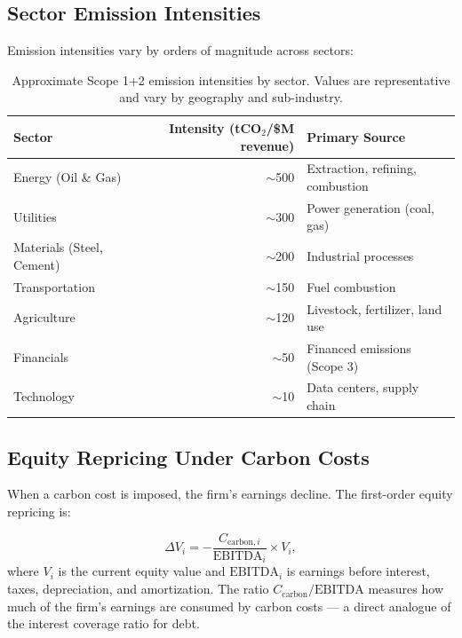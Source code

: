 \documentclass[11pt, a4paper]{article}
\theoremstyle{definition}
\theoremstyle{plain}
\theoremstyle{remark}
\begin{document}
\subsection{Sector Emission Intensities}

Emission intensities vary by orders of magnitude across sectors:

\begin{table}[H]
\centering
\caption{Approximate Scope 1+2 emission intensities by sector. Values are
representative and vary by geography and sub-industry.}
\label{tab:emission-intensity}
\begin{tabular}{@{}lrl@{}}
\toprule
\textbf{Sector} & \textbf{Intensity (tCO$_2$/\$M revenue)} &
\textbf{Primary Source} \\
\midrule
Energy (Oil \& Gas)   & $\sim$500 & Extraction, refining, combustion \\
Utilities             & $\sim$300 & Power generation (coal, gas) \\
Materials (Steel, Cement) & $\sim$200 & Industrial processes \\
Transportation        & $\sim$150 & Fuel combustion \\
Agriculture           & $\sim$120 & Livestock, fertilizer, land use \\
Financials            & $\sim$50  & Financed emissions (Scope 3) \\
Technology            & $\sim$10  & Data centers, supply chain \\
\bottomrule
\end{tabular}
\end{table}

\subsection{Equity Repricing Under Carbon Costs}

When a carbon cost is imposed, the firm's earnings decline.
The first-order equity repricing is:

\begin{equation}\label{eq:equity-repricing}
    \Delta V_i = -\frac{C_{\text{carbon},i}}{\text{EBITDA}_i} \times V_i,
\end{equation}
where $V_i$ is the current equity value and $\text{EBITDA}_i$ is earnings
before interest, taxes, depreciation, and amortization.
The ratio $C_{\text{carbon}} / \text{EBITDA}$ measures how much of the firm's
earnings are consumed by carbon costs --- a direct analogue of the interest
coverage ratio for debt.
\end{document}
